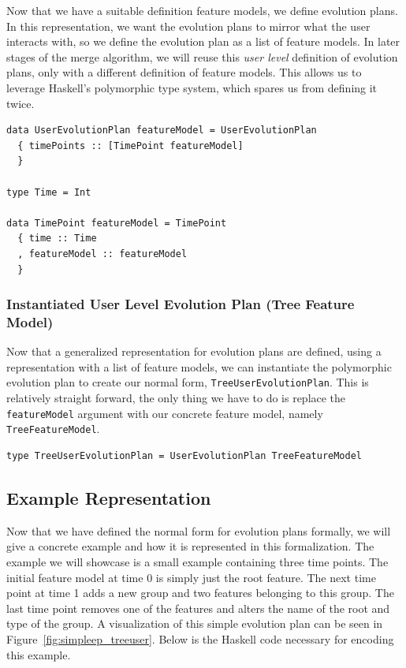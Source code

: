 \documentclass[a4paper,english]{ifimaster}
\begin{document}
Now that we have a suitable definition feature models, we define evolution plans. In this representation, we want the evolution plans to mirror what the user interacts with, so we define the evolution plan as a list of feature models. In later stages of the merge algorithm, we will reuse this \textit{user level} definition of evolution plans, only with a different definition of feature models. This allows us to leverage Haskell's polymorphic type system, which spares us from defining it twice.

\begin{verbatim}
data UserEvolutionPlan featureModel = UserEvolutionPlan
  { timePoints :: [TimePoint featureModel]
  }

type Time = Int

data TimePoint featureModel = TimePoint
  { time :: Time
  , featureModel :: featureModel
  }
\end{verbatim}

\subsubsection*{Instantiated User Level Evolution Plan (Tree Feature Model)}%
\label{ssub:instantiated_user_level_evolution_plan_tree_feature_model_}

Now that a generalized representation for evolution plans are defined, using a representation with a list of feature models, we can instantiate the polymorphic evolution plan to create our normal form, \texttt{TreeUserEvolutionPlan}. This is relatively straight forward, the only thing we have to do is replace the \texttt{featureModel} argument with our concrete feature model, namely \texttt{TreeFeatureModel}.

\begin{verbatim}
type TreeUserEvolutionPlan = UserEvolutionPlan TreeFeatureModel
\end{verbatim}

\subsection{Example Representation}%
\label{sub:example_representation}

Now that we have defined the normal form for evolution plans formally, we will give a concrete example and how it is represented in this formalization. The example we will showcase is a small example containing three time points. The initial feature model at time 0 is simply just the root feature. The next time point at time 1 adds a new group and two features belonging to this group. The last time point removes one of the features and alters the name of the root and type of the group. A visualization of this simple evolution plan can be seen in Figure~\vref{fig:simpleep_treeuser}. Below is the Haskell code necessary for encoding this example.
\end{document}
